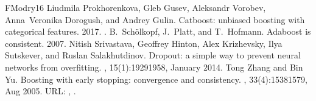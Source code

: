 \documentclass[letterpaper,10pt,english]{sphinxmanual}
\begin{document}
\begin{sphinxthebibliography}{FModry16}
Liudmila Prokhorenkova, Gleb Gusev, Aleksandr Vorobev, Anna Veronika Dorogush, and Andrey Gulin. Catboost: unbiased boosting with categorical features. 2017. .
B. Schölkopf, J. Platt, and T. Hofmann. Adaboost is consistent. 2007.
Nitish Srivastava, Geoffrey Hinton, Alex Krizhevsky, Ilya Sutskever, and Ruslan Salakhutdinov. Dropout: a simple way to prevent neural networks from overfitting. , 15(1):1929\textendash{}1958, January 2014.
Tong Zhang and Bin Yu. Boosting with early stopping: convergence and consistency. , 33(4):1538\textendash{}1579, Aug 2005. URL: , .
\end{sphinxthebibliography}







\renewcommand{\indexname}{Index}
\printindex
\end{document}
